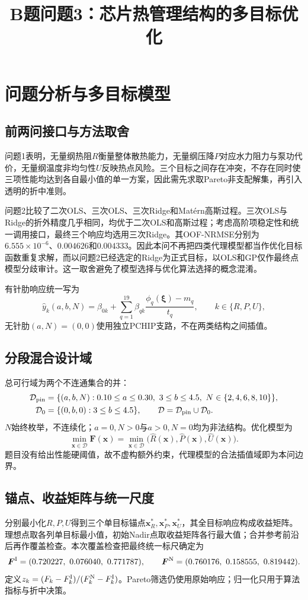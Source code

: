\documentclass[UTF8,a4paper,11pt]{ctexart}
\title{\textcolor{apmblue}{B题问题3：芯片热管理结构的多目标优化}}
\author{}\date{}
\begin{document}
\maketitle

\section{问题分析与多目标模型}
\subsection{前两问接口与方法取舍}
问题1表明，无量纲热阻$R$衡量整体散热能力，无量纲压降$P$对应水力阻力与泵功代价，无量纲温度非均匀性$U$反映热点风险。三个目标之间存在冲突，不存在同时使三项性能均达到各自最小值的单一方案，因此需先求取Pareto非支配解集，再引入透明的折中准则。

问题2比较了二次OLS、三次OLS、三次Ridge和Mat\'ern高斯过程。三次OLS与Ridge的折外精度几乎相同，均优于二次OLS和高斯过程；考虑高阶项稳定性和统一调用接口，最终三个响应均选用三次Ridge。其OOF-NRMSE分别为$6.555\times10^{-6}$、$0.004626$和$0.004333$。因此本问不再把四类代理模型都当作优化目标函数重复求解，而以问题2已经选定的Ridge为正式目标，以OLS和GP仅作最终点模型分歧审计。这一取舍避免了模型选择与优化算法选择的概念混淆。

有针肋响应统一写为
\[
 \widehat y_k(a,b,N)=\beta_{0k}+\sum_{q=1}^{19}\beta_{qk}
 \frac{\phi_q(\bm\xi)-m_q}{t_q},\qquad k\in\{R,P,U\},
\]
无针肋$(a,N)=(0,0)$使用独立PCHIP支路，不在两类结构之间插值。

\subsection{分段混合设计域}
总可行域为两个不连通集合的并：
\[
\begin{split}
\mathcal D_{\rm pin}&=\{(a,b,N):0.10\le a\le0.30,\ 3\le b\le4.5,\ N\in\{2,4,6,8,10\}\},\\
\mathcal D_0&=\{(0,b,0):3\le b\le4.5\},\qquad \mathcal D=\mathcal D_{\rm pin}\cup\mathcal D_0.
\end{split}
\]
$N$始终枚举，不连续化；$a=0,N>0$与$a>0,N=0$均为非法结构。优化模型为
\[
 \min_{\bm x\in\mathcal D}\bm F(\bm x)
 =\min_{\bm x\in\mathcal D}\bigl(\widehat R(\bm x),\widehat P(\bm x),\widehat U(\bm x)\bigr).
\]
题目没有给出性能硬阈值，故不虚构额外约束，代理模型的合法插值域即为本问边界。

\subsection{锚点、收益矩阵与统一尺度}
分别最小化$R,P,U$得到三个单目标锚点$\bm x_R^*,\bm x_P^*,\bm x_U^*$，其全目标响应构成收益矩阵。理想点取各列单目标最小值，初始Nadir点取收益矩阵各行最大值；合并参考前沿后再作覆盖检查。本次覆盖检查把最终统一标尺确定为
\[
 \bm F^{\rm I}=(0.720227,\ 0.076040,\ 0.771787),\qquad
 \bm F^{\rm N}=(0.760176,\ 0.158555,\ 0.819442).
\]
定义$z_k=(F_k-F_k^{\rm I})/(F_k^{\rm N}-F_k^{\rm I})$。Pareto筛选仍使用原始响应；归一化只用于算法指标与折中决策。
\end{document}
